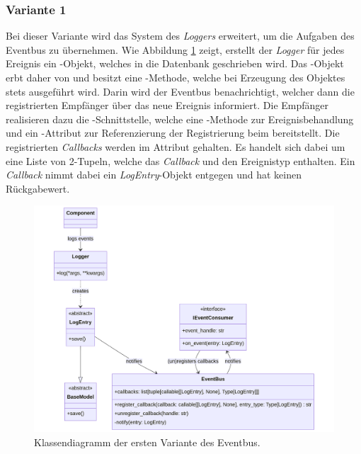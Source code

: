 \subsubsection*{Variante 1}

Bei dieser Variante wird das System des \emph{Loggers} erweitert, um die Aufgaben des Eventbus zu übernehmen. Wie Abbildung \ref{fig:eventbus-v1-class} zeigt, erstellt der \emph{Logger} für jedes Ereignis ein -Objekt, welches in die Datenbank geschrieben wird. Das -Objekt erbt daher von  und besitzt eine -Methode, welche bei Erzeugung des Objektes stets ausgeführt wird. Darin wird der Eventbus benachrichtigt, welcher dann die registrierten Empfänger über das neue Ereignis informiert. Die Empfänger realisieren dazu die -Schnittstelle, welche eine -Methode zur Ereignisbehandlung und ein -Attribut zur Referenzierung der Registrierung beim  bereitstellt. Die registrierten \emph{Callbacks} werden im Attribut  gehalten. Es handelt sich dabei um eine Liste von 2-Tupeln, welche das \emph{Callback} und den Ereignistyp enthalten. Ein \emph{Callback} nimmt dabei ein \emph{LogEntry}-Objekt entgegen und hat keinen Rückgabewert.

\begin{figure}[htb]
	\centering
	\includegraphics[width=1.0\linewidth]{images/diagrams/eventbus-v1-class.png}
	\caption{Klassendiagramm der ersten Variante des Eventbus.}
	\label{fig:eventbus-v1-class}
\end{figure}

